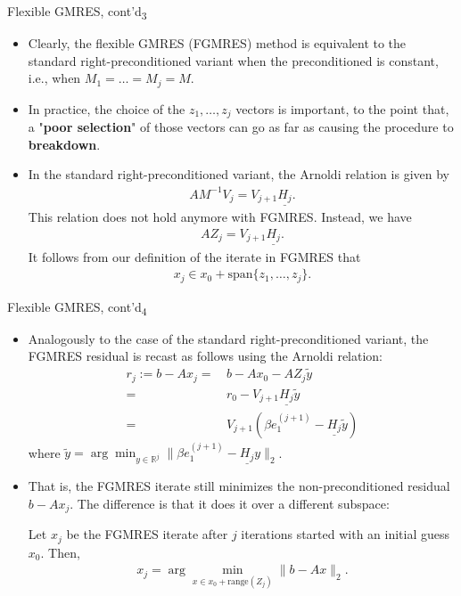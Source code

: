 \documentclass[t,usepdftitle=false]{beamer}
\begin{document}
\begin{frame}{Flexible GMRES, cont'd\textsubscript{3}}
\begin{itemize}
\item Clearly, the flexible GMRES (FGMRES) method is equivalent to the standard right-preconditioned variant when the preconditioned is constant, i.e., when $M_1=\dots=M_j=M$.
\item In practice, the choice of the $z_1,\dots,z_j$ vectors is important, to the point that, a "\textbf{poor selection}" of those vectors can go as far as causing the procedure to \textbf{breakdown}.
\item In the standard right-preconditioned variant, the Arnoldi relation is given by
\begin{align*}
AM^{-1}V_{j}=V_{j+1}\underline{H_j}.
\end{align*}
This relation does not hold anymore with FGMRES.
Instead, we have
\begin{align*}
AZ_j=V_{j+1}\underline{H_j}.
\end{align*}
It follows from our definition of the iterate in FGMRES that 
\begin{align*}
x_j\in x_0+\text{span}\{z_1,\dots,z_j\}.
\end{align*}
\end{itemize}
\end{frame}

\begin{frame}{Flexible GMRES, cont'd\textsubscript{4}}
\begin{itemize}
\item Analogously to the case of the standard right-preconditioned variant, the FGMRES residual is recast as follows using the Arnoldi relation:
\begin{align*}
r_j
:=b-Ax_j
=&\,b-Ax_0-AZ_j\tilde{y}\\
=&\,r_0-V_{j+1}\underline{H_j}\tilde{y}\\
=&\,V_{j+1}(\beta e_1^{(j+1)}-\underline{H_j}\tilde{y})
\end{align*}
where $\tilde{y}=\arg\min_{y\in\mathbb{R}^j}\|\beta e_1^{(j+1)}-\underline{H_j}y\|_2$.
\item[] That is, the FGMRES iterate still minimizes the non-preconditioned residual $b-Ax_j$.
The difference is that it does it over a different subspace:
\begin{theorem}
Let $x_j$ be the FGMRES iterate after $j$ iterations started with an initial guess $x_0$.
Then,\vspace{-.15cm}
\begin{align*}
x_j=\arg\min_{x\in x_0+\text{range}(Z_j)}\|b-Ax\|_2.
\end{align*}
\end{theorem}
\end{itemize}
\end{frame}
\end{document}
